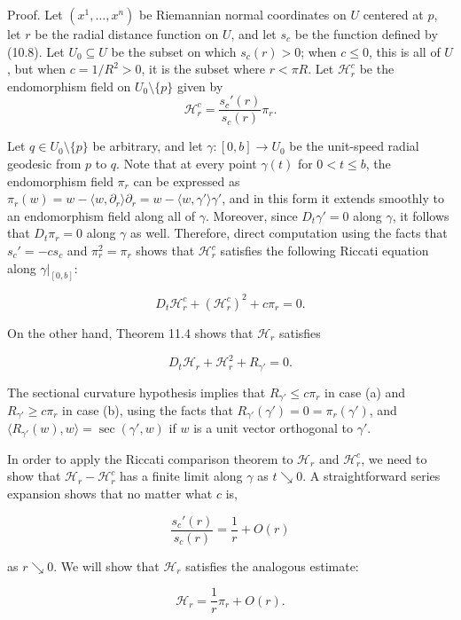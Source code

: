 Proof. Let $(x^1, \ldots, x^n)$ be Riemannian normal coordinates on $U$ centered at $p$, let
$r$ be the radial distance function on $U$, and let $s_c$ be the function defined by (10.8).
Let $U_0 \subseteq U$ be the subset on which $s_c(r) > 0$; when $c \leq 0$, this is all of $U$, but when
$c = 1/R^2 > 0$, it is the subset where $r < \pi R$. Let $\mathcal{H}^c_r$ be the endomorphism field on $U_0 \setminus \{p\}$ given by
\[
\mathcal{H}_r^c = \frac{s_c'(r)}{s_c(r)} \pi_r.
\]

Let $q \in U_0 \setminus \{p\}$ be arbitrary, and let $\gamma: [0,b] \to U_0$ be the unit-speed radial geodesic from $p$ to $q$. Note that at every point $\gamma(t)$ for $0 < t \leq b$, the endomorphism field $\pi_r$ can be expressed as $\pi_r(w) = w - \langle w, \partial_r\rangle \partial_r = w - \langle w, \gamma'\rangle \gamma'$, and in this form it extends smoothly to an endomorphism field along all of $\gamma$. Moreover, since $D_t\gamma' = 0$ along $\gamma$, it follows that $D_t\pi_r = 0$ along $\gamma$ as well. Therefore, direct computation using the facts that $s_c' = -cs_c$ and $\pi_r^2 = \pi_r$ shows that $\mathcal{H}_r^c$ satisfies the following Riccati equation along $\gamma|_{[0,b]}$:

\[
D_t \mathcal{H}_r^c + (\mathcal{H}_r^c)^2 + c\pi_r = 0.
\]

On the other hand, Theorem 11.4 shows that $\mathcal{H}_r$ satisfies

\[
D_t \mathcal{H}_r + \mathcal{H}_r^2 + R_{\gamma'} = 0.
\]

The sectional curvature hypothesis implies that $R_{\gamma'} \leq c\pi_r$ in case (a) and $R_{\gamma'} \geq c\pi_r$ in case (b), using the facts that $R_{\gamma'}(\gamma') = 0 = \pi_r(\gamma')$, and $\langle R_{\gamma'}(w), w\rangle = \sec(\gamma', w)$ if $w$ is a unit vector orthogonal to $\gamma'$.

In order to apply the Riccati comparison theorem to $\mathcal{H}_r$ and $\mathcal{H}_r^c$, we need to show that $\mathcal{H}_r - \mathcal{H}_r^c$ has a finite limit along $\gamma$ as $t \searrow 0$. A straightforward series expansion shows that no matter what $c$ is,

\begin{equation}
\frac{s_c'(r)}{s_c(r)} = \frac{1}{r} + O(r)
\tag{11.19}
\end{equation}

as $r \searrow 0$. We will show that $\mathcal{H}_r$ satisfies the analogous estimate:

\begin{equation}
\mathcal{H}_r = \frac{1}{r}\pi_r + O(r).
\tag{11.20}
\end{equation}

